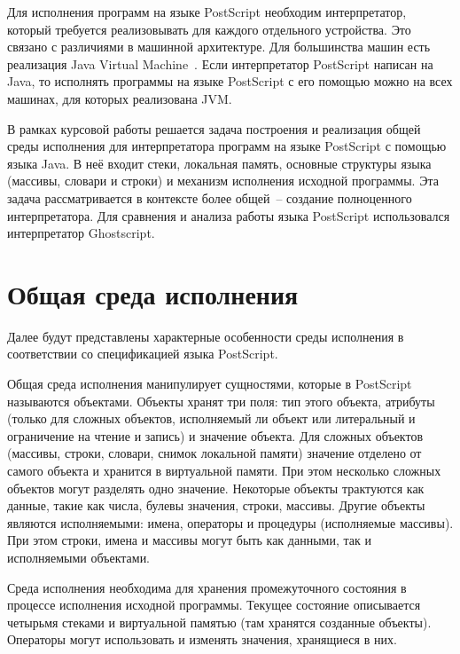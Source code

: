 Для исполнения программ на языке PostScript необходим интерпретатор, который требуется реализовывать для каждого отдельного устройства. Это связано с различиями в машинной архитектуре. Для большинства машин есть реализация Java Virtual Machine~\cite{pjvms}. Если интерпретатор PostScript написан на Java, то исполнять программы на языке PostScript с его помощью можно на всех машинах, для которых реализована JVM.

В рамках курсовой работы решается задача построения и реализация общей среды исполнения для интерпретатора программ на языке PostScript с помощью языка Java. В неё входит стеки, локальная память, основные структуры языка (массивы, словари и строки) и механизм исполнения исходной программы. Эта задача рассматривается в контексте более общей~-- создание полноценного интерпретатора.  Для сравнения и анализа работы языка PostScript использовался интерпретатор Ghostscript.


\section{Общая среда исполнения}
Далее будут представлены характерные особенности среды исполнения в соответствии со спецификацией языка PostScript\cite{PLRM}.

Общая среда исполнения манипулирует сущностями, которые в PostScript называются  объектами. Объекты хранят три поля: тип этого объекта, атрибуты (только для сложных объектов, исполняемый ли объект или литеральный и ограничение на чтение и запись) и значение объекта. Для сложных объектов (массивы, строки, словари, снимок локальной памяти) значение отделено от самого объекта и хранится в виртуальной памяти. При этом несколько сложных объектов могут разделять одно значение. Некоторые объекты трактуются как данные, такие как числа, булевы значения, строки, массивы. Другие объекты являются исполняемыми: имена, операторы и процедуры (исполняемые массивы). При этом строки, имена и массивы могут быть как данными, так и исполняемыми объектами.

Среда исполнения необходима для хранения промежуточного состояния в процессе исполнения исходной программы. Текущее состояние описывается четырьмя стеками и виртуальной памятью (там хранятся созданные объекты). Операторы могут использовать и изменять значения, хранящиеся в них.


